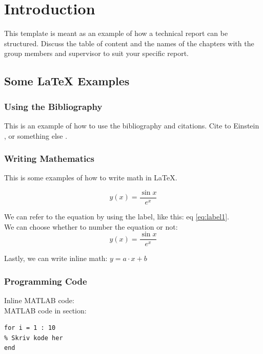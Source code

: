 \chapter{Introduction}
This template is meant as an example
of how a technical report can be
structured. Discuss the table of content and the names of the chapters with the
group members and supervisor to suit your specific report.\\

\section{Some \LaTeX{} Examples}

\subsection{Using the Bibliography}

This is an example of how to use the bibliography and citations. Cite to Einstein \cite{einstein}, or something else \cite{dirac}.\\


\subsection{Writing Mathematics}

This is some examples of how to write math in \LaTeX.

\begin{equation}
    y(x) = \frac{\sin x}{e^x}
    \label{eq:label1}
\end{equation}

We can refer to the equation by using the label, like this: eq \ref{eq:label1}.\\

We can choose whether to number the equation or not:
\begin{equation*}
    y(x) = \frac{\sin x}{e^x}
\end{equation*}

Lastly, we can write inline math: $y = a \cdot x + b$ 

\subsection{Programming Code}

Inline MATLAB code: \\

MATLAB code in section:
\begin{lstlisting}
for i = 1 : 10
% Skriv kode her
end
\end{lstlisting}


